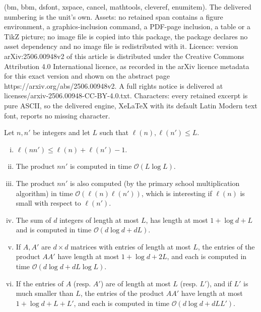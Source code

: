 \documentclass[10pt,a4paper]{amsart}
\def\O{\mathcal{O}}
\begin{document}
(bm, bbm, dsfont, xspace, cancel, mathtools, cleveref, enumitem). The delivered numbering is the unit's own. Assets: no retained span contains a figure environment, a graphics-inclusion command, a PDF-page inclusion, a table or a TikZ picture; no image file is copied into this package, the package declares no asset dependency and no image file is redistributed with it. Licence: version arXiv:2506.00948v2 of this article is distributed under the Creative Commons Attribution 4.0 International licence, as recorded in the arXiv licence metadata for this exact version and shown on the abstract page https://arxiv.org/abs/2506.00948v2. A full rights notice is delivered at licenses/arxiv-2506.00948-CC-BY-4.0.txt. Characters: every retained excerpt is pure ASCII, so the delivered engine, XeLaTeX with its default Latin Modern text font, reports no missing character.
\begin{proposition}\label{prop: basic facts}
%
Let $n,n'$ be integers and let $L$ such that $\ell(n), \ell(n') \le L$.
%
\begin{enumerate}[(i)]
%
\item $\ell(nn') \le \ell(n) + \ell(n') - 1$. 
%
\item\label{fact: HvdH} The product $nn'$ is computed in time $\O(L\log L)$.

\item The product $nn'$ is also computed (by the primary school multiplication algorithm) in time $\O(\ell(n)\ell(n'))$, which is interesting if $\ell(n)$ is small with respect to $\ell(n')$.

\item The sum of $d$ integers of length at most $L$, has length at most $1 + \log d + L$ and is computed in time $\O(d\log d + dL)$.

\item\label{fact: product by general matrix} If $A, A'$ are $d \times d$ matrices with entries of length at most $L$, the entries of the product $AA'$ have length at most $1 + \log d + 2L$, and each is computed in time $\O(d\log d + dL\log L)$.

\item\label{fact: product by fixed matrix} If the entries of $A$ (resp. $A'$) are of length at most $L$ (resp. $L'$), and if $L'$ is much smaller than $L$, the entries of the product $AA'$ have length at most $1 + \log d + L + L'$, and each is computed in time $\O(d\log d + dLL')$.
%
\end{enumerate}
%
\end{proposition}
\end{document}
